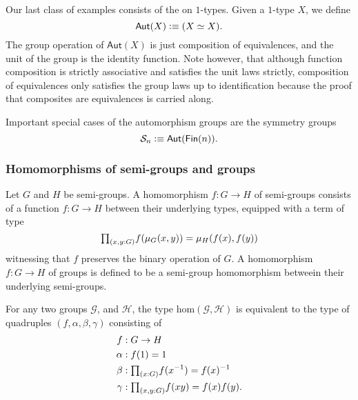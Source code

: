 \begin{eg}
  Our last class of examples consists of the  on $1$-types. Given a $1$-type $X$, we define
  \begin{equation*}
    \mathsf{Aut}(X)\vcentcolon\equiv (X\simeq X).
  \end{equation*}
  The group operation of $\mathsf{Aut}(X)$ is just composition of equivalences, and the unit of the group is the identity function. Note however, that although function composition is strictly associative and satisfies the unit laws strictly, composition of equivalences only satisfies the group laws up to identification because the proof that composites are equivalences is carried along.

  Important special cases of the automorphism groups are the symmetry groups
  \begin{equation*}
    \mathcal{S}_n\vcentcolon\equiv \mathsf{Aut}(\mathsf{Fin}(n)).
  \end{equation*}
\end{eg}

\subsubsection{Homomorphisms of semi-groups and groups}

\begin{defn}
  Let $G$ and $H$ be semi-groups. A homomorphism $f:G\to H$ of semi-groups consists of a function $f:G\to H$ between their underlying types, equipped with a term of type
  \begin{equation*}
    \prd{x,y:G} f(\mu_G(x,y))=\mu_H(f(x),f(y))
  \end{equation*}
  witnessing that $f$ preserves the binary operation of $G$. A homomorphism $f:G\to H$ of groups is defined to be a semi-group homomorphism betweein their underlying semi-groups. 
\end{defn}

\begin{lem}
For any two groups $\mathcal{G}$, and $\mathcal{H}$, the type $\mathrm{hom}(\mathcal{G},\mathcal{H})$ is equivalent to the type of quadruples $(f,\alpha,\beta,\gamma)$ consisting of
\begin{align*}
f & : G \to H \\
\alpha & : f(1)=1 \\
\beta & : \prd{x:G}f(x^{-1})=f(x)^{-1} \\
\gamma & : \prd{x,y:G} f(xy)=f(x)f(y).
\end{align*}
\end{lem}

